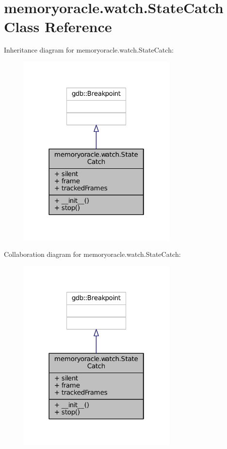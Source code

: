 \hypertarget{classmemoryoracle_1_1watch_1_1StateCatch}{}\section{memoryoracle.\+watch.\+State\+Catch Class Reference}
\label{classmemoryoracle_1_1watch_1_1StateCatch}


Inheritance diagram for memoryoracle.\+watch.\+State\+Catch\+:\nopagebreak
\begin{figure}[H]
\begin{center}
\leavevmode
\includegraphics[width=226pt]{classmemoryoracle_1_1watch_1_1StateCatch__inherit__graph}
\end{center}
\end{figure}


Collaboration diagram for memoryoracle.\+watch.\+State\+Catch\+:\nopagebreak
\begin{figure}[H]
\begin{center}
\leavevmode
\includegraphics[width=226pt]{classmemoryoracle_1_1watch_1_1StateCatch__coll__graph}
\end{center}
\end{figure}
